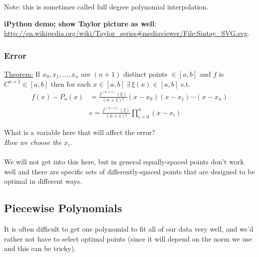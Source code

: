 \documentclass[12pt]{exam}
\begin{document}
Note: this is sometimes called full degree polynomial interpolation.

\textbf{iPython demo; show Taylor picture as well}:\\ \href{http://en.wikipedia.org/wiki/Taylor_series#mediaviewer/File:Sintay_SVG.svg}{http://en.wikipedia.org/wiki/Taylor\_series\#mediaviewer/File:Sintay\_SVG.svg}.

\clearpage
\subsubsection*{Error}
\underline{Theorem:} If $x_0, x_1,\dots, x_n$ are $(n+1)$ distinct points $\in [a,b]$ and $f$ is $C^{n+1} \in [a,b]$ then for each $x\in [a,b] \: \exists \: \xi(x) \in [a,b]$ s.t.
\begin{align}
f(x) - P_n(x)& = \frac{f^{(n+1)}(\xi)}{(n+1)!}(x-x_0)(x-x_1)\cdots(x-x_n)\nonumber \\
&\boxed{e = \frac{f^{(n+1)}(\xi)}{(n+1)!}\prod_{i=0}^n (x-x_i)}\nonumber
\end{align}
%
%

What is a variable here that will affect the error? \\ 
\ifprintanswers
\textit{How we choose the $x_i$.} \\
\else
\vspace*{1em}\\
\fi
We will not get into this here, but in general equally-spaced points don't work well and there are specific sets of differently-spaced points that are designed to be optimal in different ways. 

\subsection*{Piecewise Polynomials}

It is often difficult to get one polynomial to fit all of our data very well, and we'd rather not have to select optimal points (since it will depend on the norm we use and this can be tricky). 
\end{document}
